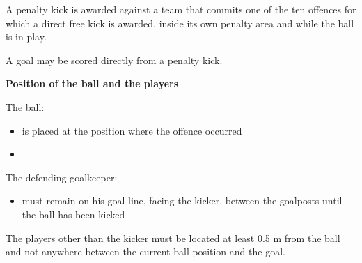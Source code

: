 \clearpage
\sffamily
{\bfseries \color[rgb]{0.4,0.4,0.4}{Law 14 -- The Penalty Kick}}
{}

\bigskip
A penalty kick is awarded against a team that commits one of the ten
offences for which a direct free kick is awarded, inside its own
penalty area and while the ball is in play.

\bigskip

A goal may be scored directly from a penalty kick.

\bigskip


\bigskip

{\bfseries Position of the ball and the players }

\headlinebox

The ball:

\begin{itemize}
\item is placed at the position where the offence occurred 
\end{itemize}

\bigskip


\begin{itemize}
\item {}
\end{itemize}

\bigskip

The defending goalkeeper:

\begin{itemize}
\item must remain on his goal line, facing the kicker, between the goalposts
until the ball has been kicked 
\end{itemize}

\bigskip

The players other than the kicker must be located at least 0.5 m from the ball and not anywhere between the current ball position and the goal. \\


